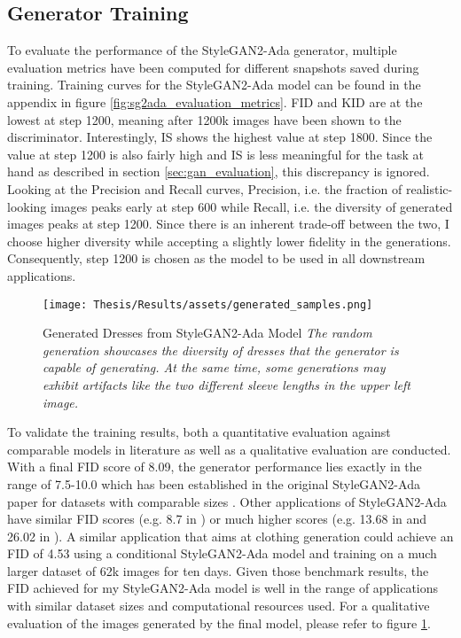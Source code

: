 \subsection{Generator Training}
To evaluate the performance of the StyleGAN2-Ada generator, multiple evaluation metrics have been computed for different snapshots saved during training. Training curves for the StyleGAN2-Ada model can be found in the appendix in figure \ref{fig:sg2ada_evaluation_metrics}. FID and KID are at the lowest at step 1200, meaning after 1200k images have been shown to the discriminator. Interestingly, IS shows the highest value at step 1800. Since the value at step 1200 is also fairly high and IS is less meaningful for the task at hand as described in section \ref{sec:gan_evaluation}, this discrepancy is ignored. Looking at the Precision and Recall curves, Precision, i.e. the fraction of realistic-looking images peaks early at step 600 while Recall, i.e. the diversity of generated images peaks at step 1200. Since there is an inherent trade-off between the two, I choose higher diversity while accepting a slightly lower fidelity in the generations. Consequently, step 1200 is chosen as the model to be used in all downstream applications.
\begin{figure}[ht!]
    \centering
    \texttt{[image: Thesis/Results/assets/generated\_samples.png]}
    \caption[Generated Dresses from StyleGAN2-Ada Model]{Generated Dresses from StyleGAN2-Ada Model \textit{The random generation showcases the diversity of dresses that the generator is capable of generating. At the same time, some generations may exhibit artifacts like the two different sleeve lengths in the upper left image.}}
    \label{fig:generated_samples}
\end{figure}

To validate the training results, both a quantitative evaluation against comparable models in literature as well as a qualitative evaluation are conducted. With a final FID score of 8.09, the generator performance lies exactly in the range of 7.5-10.0 which has been established in the original StyleGAN2-Ada paper for datasets with comparable sizes \citep[p.8]{stylegan2}. Other applications of StyleGAN2-Ada have similar FID scores (e.g. 8.7 in \cite{fu2022stylegan}) or much higher scores (e.g. 13.68 in \cite{hermosilla2021thermal} and 26.02 in \cite{kim2022effective}). A similar application that aims at clothing generation could achieve an FID of 4.53 using a conditional StyleGAN2-Ada model and training on a much larger dataset of 62k images for ten days. Given those benchmark results, the FID achieved for my StyleGAN2-Ada model is well in the range of applications with similar dataset sizes and computational resources used. For a qualitative evaluation of the images generated by the final model, please refer to figure \ref{fig:generated_samples}.


